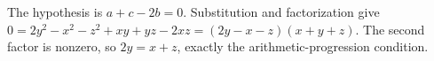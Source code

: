 The hypothesis is $a+c-2b=0$. Substitution and factorization give $0=2y^2-x^2-z^2+xy+yz-2xz=(2y-x-z)(x+y+z)$. The second factor is nonzero, so $2y=x+z$, exactly the arithmetic-progression condition.
